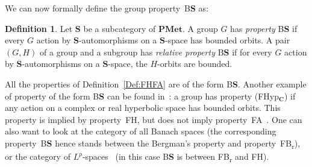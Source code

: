 \documentclass[a4paper]{article}
\theoremstyle{definition}
\newtheorem{defn}[lem]{Definition}
\newcommand*{\field}[1]{\mathbf{#1}}
\newcommand*{\category}[1]{\textbf{#1}}
\newcommand*{\PMet}{\category{PMet}}
\newcommand*{\BS}{B\textbf{S}}
\newcommand*{\FB}{FB\textsubscript{r}}
\newcommand*{\FH}{FH}
\newcommand*{\FA}{FA}
\begin{document}
We can now formally define the group property~\BS{} as:
%
\begin{defn}\label{Def:PropBS}
Let $\category S$ be a subcategory of $\PMet$.
A group $G$ has \emph{property} \BS{} if every $G$ action by $\category S$-automorphisms on a $\category S$-space has bounded orbits.
A pair $(G,H)$ of a group and a subgroup has \emph{relative property} \BS{} if for every $G$ action by $\category S$-automorphisms on a $\category S$-space, the $H$-orbits are bounded.
\end{defn}
%
%
All the properties of Definition~\ref{Def:FHFA} are of the form \BS.
Another example of property of the form \BS{} can be found in~\cite[Definition 6.22]{MR1023471}: a group has property (FHyp$_{\field{C}}$) if any action on a complex or real hyperbolic space has bounded orbits.
This property is implied by property~\FH, but does not imply property~\FA{}~\cite[Corollary 6.23 and Example 6.24]{MR1023471}.
One can also want to look at the category of all Banach spaces (the corresponding property~\BS{} hence stands between the Bergman's property and property~\FB), or the category of $L^p$-spaces~\cite{MR2978328} (in this case \BS{} is between \FB{} and \FH).
\end{document}
